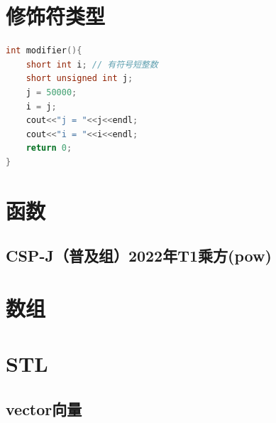 \documentclass[12pt,twiside,a4paper]{ctexbook}
\numberwithin{chapter}{part}
\begin{document}
\chapter{修饰符类型}
\begin{lstlisting}[language=C++]
int modifier(){
	short int i; // 有符号短整数
	short unsigned int j;
	j = 50000;
	i = j;
	cout<<"j = "<<j<<endl;	
	cout<<"i = "<<i<<endl;	
	return 0;
}
\end{lstlisting}

\chapter{函数}
\section{CSP-J（普及组）2022年T1乘方(pow)}

\chapter{数组}

\chapter{STL}
\section{vector向量}
\end{document}
